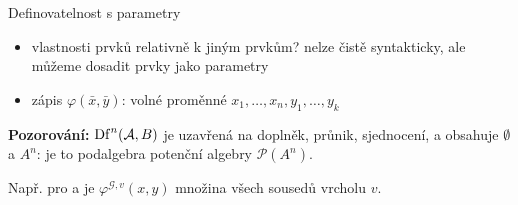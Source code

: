 \documentclass{beamer}
\begin{document}
\begin{frame}{Definovatelnost s parametry}

    \begin{itemize}
        \item vlastnosti prvků relativně k jiným prvkům? nelze čistě syntakticky, ale můžeme dosadit prvky jako \alert{parametry}
        \item zápis \alert{$\varphi(\bar x,\bar y)$}: volné proměnné $x_1,\dots,x_n,y_1,\dots,y_k$
    \end{itemize}


    \textbf{Pozorování:} $\mathrm{Df}^n(\mathcal{A},B)$ je uzavřená na doplněk, průnik, sjednocení, a obsahuje $\emptyset$ a $A^n$: je to \alert{podalgebra potenční algebry} $\mathcal P(A^n)$.

    \medskip
    Např. pro  a  je $\varphi^{\mathcal G,v}(x,y)$ množina všech sousedů vrcholu $v$.
    
\end{frame}
\end{document}
